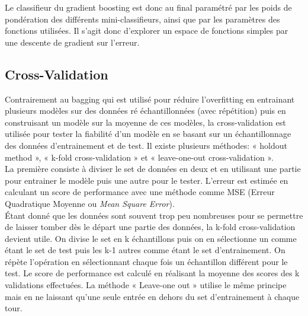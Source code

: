 \noindent Le classifieur du gradient boosting est donc au final paramétré par les poids de pondération des différents mini-classifieurs, ainsi que par les paramètres des fonctions utilisées. Il s’agit donc d’explorer un espace de fonctions simples par une descente de gradient sur l’erreur\cite{EnsembleMethods}.

\subsection{Cross-Validation}

Contrairement au bagging qui est utilisé pour réduire l'overfitting en entrainant plusieurs modèles sur des données ré échantillonnées (avec répétition) puis en construisant un modèle sur la moyenne de ces modèles, la cross-validation est utilisée pour tester la fiabilité d'un modèle en se basant sur un échantillonnage des données d'entrainement et de test. Il existe plusieurs méthodes: « holdout method », « k-fold cross-validation » et « leave-one-out cross-validation ».\\

\noindent La première consiste à diviser le set de données en deux et en utilisant une partie pour entrainer le modèle puis une autre pour le tester. L'erreur est estimée en calculant un score de performance avec une méthode comme MSE (Erreur Quadratique Moyenne ou \textit{Mean Square Error}). \\

\noindent Étant donné que les données sont souvent trop peu nombreuses pour se permettre de laisser tomber dès le départ une partie des données, la k-fold cross-validation devient utile. On divise le set en k échantillons puis on en sélectionne un comme étant le set de test puis les k-1 autres comme étant le set d'entrainement. On répète l'opération en sélectionnant chaque fois un échantillon différent pour le test. Le score de performance est calculé en réalisant la moyenne des scores des k validations effectuées. La méthode « Leave-one out » utilise le même principe mais en ne laissant qu'une seule entrée en dehors du set d'entrainement à chaque tour\cite{hastie_09_elements-of.statistical-learning}. 


